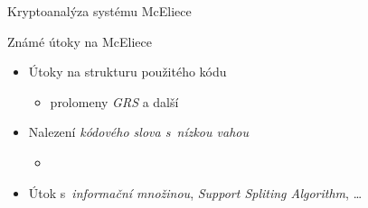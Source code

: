 \documentclass{beamer}
\begin{document}
\begin{frame}{Kryptoanalýza systému McEliece}

    \begin{alertblock}{Známé útoky na McEliece}
        \begin{itemize}

                \pause
            \item Útoky na strukturu použitého kódu
                \begin{itemize}
                    \item prolomeny \emph{GRS} a další
                \end{itemize}

            \item Nalezení \emph{kódového slova s~nízkou vahou}
                \begin{itemize}
                    \item {}~\cite{Canteaut}
                \end{itemize}

            \item Útok s~\emph{informační množinou}, \emph{Support Spliting Algorithm}, \ldots

        \end{itemize}
    \end{alertblock}

\end{frame}
\end{document}
